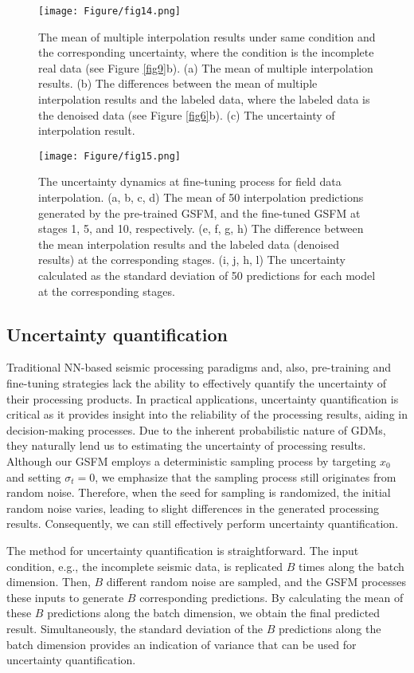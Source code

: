 \begin{figure*}[htbp]
\centering
\texttt{[image: Figure/fig14.png]}
\caption{The mean of multiple interpolation results under same condition and the corresponding uncertainty, where the condition is the incomplete real data (see Figure \ref{fig9}b). (a) The mean of multiple interpolation results. (b) The differences between the mean of multiple interpolation results and the labeled data, where the labeled data is the denoised data (see Figure \ref{fig6}b). (c) The uncertainty of interpolation result.}
\label{fig14}
\end{figure*}

\begin{figure*}[htbp]
\centering
\texttt{[image: Figure/fig15.png]}
\caption{The uncertainty dynamics at fine-tuning process for field data interpolation. (a, b, c, d) The mean of 50 interpolation predictions generated by the pre-trained GSFM, and the fine-tuned GSFM at stages 1, 5, and 10, respectively. (e, f, g, h) The difference between the mean interpolation results and the labeled data (denoised results) at the corresponding stages. (i, j, h, l) The uncertainty calculated as the standard deviation of 50 predictions for each model at the corresponding stages.}
\label{fig15}
\end{figure*}

\subsection{Uncertainty quantification}
Traditional NN-based seismic processing paradigms and, also, pre-training and fine-tuning strategies lack the ability to effectively quantify the uncertainty of their processing products. In practical applications, uncertainty quantification is critical as it provides insight into the reliability of the processing results, aiding in decision-making processes. Due to the inherent probabilistic nature of GDMs, they naturally lend us to estimating the uncertainty of processing results. Although our GSFM employs a deterministic sampling process by targeting $x_0$ and setting $\sigma_t=0$, we emphasize that the sampling process still originates from random noise. Therefore, when the seed for sampling is randomized, the initial random noise varies, leading to slight differences in the generated processing results. Consequently, we can still effectively perform uncertainty quantification. 

The method for uncertainty quantification is straightforward. The input condition, e.g., the incomplete seismic data, is replicated $B$ times along the batch dimension. Then, $B$ different random noise are sampled, and the GSFM processes these inputs to generate $B$ corresponding predictions. By calculating the mean of these $B$ predictions along the batch dimension, we obtain the final predicted result. Simultaneously, the standard deviation of the $B$ predictions along the batch dimension provides an indication of variance that can be used for uncertainty quantification. 

